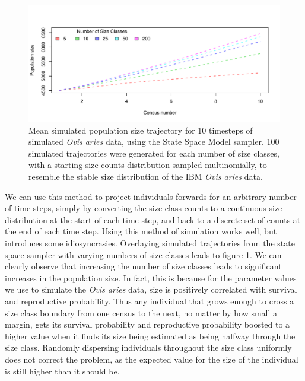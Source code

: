 \documentclass[a4paper,12pt]{article}
\begin{document}
\begin{figure}[H]
\centering
\includegraphics[scale=0.75]{sizeClasses.pdf}
\caption{\label{sizeClasses}Mean simulated population size trajectory for 10 timesteps of simulated \textit{Ovis aries} data, using the State Space Model sampler. 100 simulated trajectories were generated for each number of size classes, with a starting size counts distribution sampled multinomially, to resemble the stable size distribution of the IBM \textit{Ovis aries} data.}
\end{figure}

We can use this method to project individuals forwards for an arbitrary number of time steps, simply by converting the size class counts to a continuous size distribution at the start of each time step, and back to a discrete set of counts at the end of each time step. Using this method of simulation works well, but introduces some idiosyncrasies. Overlaying simulated trajectories from the state space sampler with varying numbers of size classes leads to figure \ref{sizeClasses}. We can clearly observe that increasing the number of size classes leads to significant increases in the population size. In fact, this is because for the parameter values we use to simulate the \textit{Ovis aries} data, size is positively correlated with survival and reproductive probability. Thus any individual that grows enough to cross a size class boundary from one census to the next, no matter by how small a margin, gets its survival probability and reproductive probability boosted to a higher value when it finds its size being estimated as being halfway through the size class. Randomly dispersing individuals throughout the size class uniformly does not correct the problem, as the expected value for the size of the individual is still higher than it should be. \\
\end{document}
